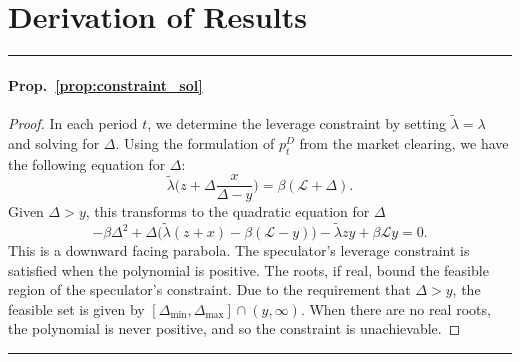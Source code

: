 \section{Derivation of Results}




\noindent\rule{\textwidth}{1pt}
\paragraph{Prop.~\ref{prop:constraint_sol}} \hypertarget{pf:constraint_sol}{}
\begin{proof}
	In each period $t$, we determine the leverage constraint by setting $\tilde \lambda = \lambda$ and solving for $\Delta$. Using the formulation of $p^D_t$ from the market clearing, we have the following equation for $\Delta$:
	$$\tilde \lambda \Big(z + \Delta \frac{x}{\Delta - y}\Big) = \beta(\mathcal{L} + \Delta).$$
	Given $\Delta>y$, this transforms to the quadratic equation for $\Delta$
	$$-\beta \Delta^2 + \Delta\Big( \tilde \lambda (z+x) - \beta(\mathcal{L} - y)\Big) - \tilde\lambda zy + \beta\mathcal{L} y =0.$$
	This is a downward facing parabola. The speculator's leverage constraint is satisfied when the polynomial is positive. The roots, if real, bound the feasible region of the speculator's constraint. Due to the requirement that $\Delta > y$, the feasible set is given by $[\Delta_{\min}, \Delta_{\max}] \cap (y, \infty)$. When there are no real roots, the polynomial is never positive, and so the constraint is unachievable.
\end{proof}



\noindent\rule{\textwidth}{1pt}
